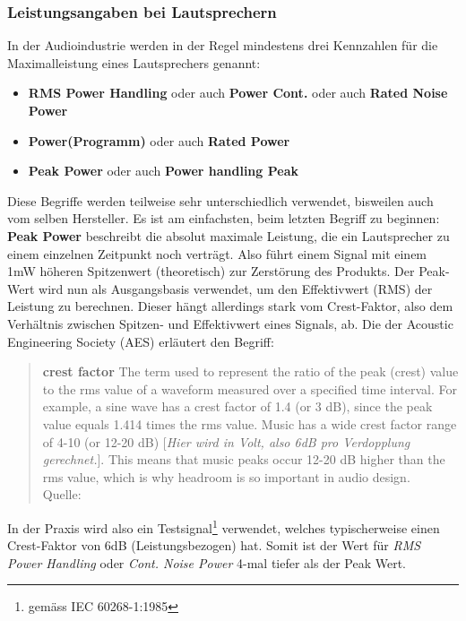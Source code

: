 \subsubsection{Leistungsangaben bei Lautsprechern} \label{chap:leistungsangaben} In der Audioindustrie werden in der Regel mindestens drei Kennzahlen für die Maximalleistung eines Lautsprechers genannt:
\begin{itemize}
	\item \textbf{RMS Power Handling} oder auch \textbf{Power Cont.} oder auch \textbf{Rated Noise Power}
	\item \textbf{Power(Programm)} oder auch \textbf{Rated Power}
	\item \textbf{Peak Power} oder auch \textbf{Power handling Peak}
\end{itemize}
Diese Begriffe werden teilweise sehr unterschiedlich verwendet, bisweilen auch vom selben Hersteller. Es ist am einfachsten, beim letzten Begriff zu beginnen:
\textbf{Peak Power} beschreibt die absolut maximale Leistung, die ein Lautsprecher zu einem einzelnen Zeitpunkt noch verträgt. Also führt einem Signal mit einem 1mW höheren Spitzenwert (theoretisch) zur Zerstörung des Produkts.
Der Peak-Wert wird nun als Ausgangsbasis verwendet, um den Effektivwert (RMS) der Leistung zu berechnen. Dieser hängt allerdings stark vom Crest-Faktor, also dem Verhältnis zwischen Spitzen- und Effektivwert eines Signals, ab. Die  der Acoustic Engineering Society (AES)  erläutert den Begriff:
\begin{quotation}
	\textbf{crest factor} The term used to represent the ratio of the peak (crest) value to the rms value of a waveform measured over a specified time interval. For example, a sine wave has a crest factor of 1.4 (or 3 dB), since the peak value equals 1.414 times the rms value. Music has a wide crest factor range of 4-10 (or 12-20 dB) [\textit{Hier wird in Volt, also 6dB pro Verdopplung gerechnet.}]. This means that music peaks occur 12-20 dB higher than the rms value, which is why headroom is so important in audio design.\\Quelle: \cite{aespar} \label{cite:crest}
\end{quotation}
In der Praxis wird also ein Testsignal\footnote{gemäss IEC 60268-1:1985} verwendet, welches typischerweise einen Crest-Faktor von 6dB (Leistungsbezogen) hat. Somit ist der Wert für \textit{RMS Power Handling} oder \textit{Cont. Noise Power} 4-mal tiefer als der Peak Wert.
